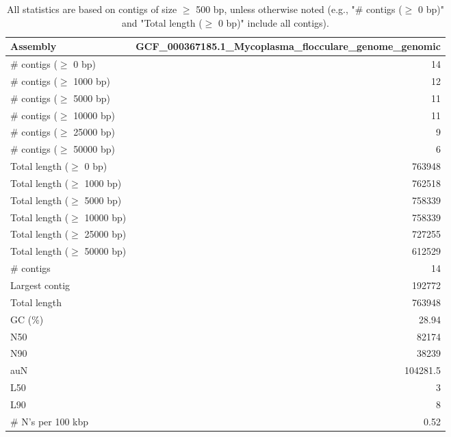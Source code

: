 \documentclass[12pt,a4paper]{article}
\begin{document}
\begin{table}[ht]
\begin{center}
\caption{All statistics are based on contigs of size $\geq$ 500 bp, unless otherwise noted (e.g., "\# contigs ($\geq$ 0 bp)" and "Total length ($\geq$ 0 bp)" include all contigs).}
\begin{tabular}{|l*{1}{|r}|}
\hline
Assembly & GCF\_000367185.1\_Mycoplasma\_flocculare\_genome\_genomic \\ \hline
\# contigs ($\geq$ 0 bp) & 14 \\ \hline
\# contigs ($\geq$ 1000 bp) & 12 \\ \hline
\# contigs ($\geq$ 5000 bp) & 11 \\ \hline
\# contigs ($\geq$ 10000 bp) & 11 \\ \hline
\# contigs ($\geq$ 25000 bp) & 9 \\ \hline
\# contigs ($\geq$ 50000 bp) & 6 \\ \hline
Total length ($\geq$ 0 bp) & 763948 \\ \hline
Total length ($\geq$ 1000 bp) & 762518 \\ \hline
Total length ($\geq$ 5000 bp) & 758339 \\ \hline
Total length ($\geq$ 10000 bp) & 758339 \\ \hline
Total length ($\geq$ 25000 bp) & 727255 \\ \hline
Total length ($\geq$ 50000 bp) & 612529 \\ \hline
\# contigs & 14 \\ \hline
Largest contig & 192772 \\ \hline
Total length & 763948 \\ \hline
GC (\%) & 28.94 \\ \hline
N50 & 82174 \\ \hline
N90 & 38239 \\ \hline
auN & 104281.5 \\ \hline
L50 & 3 \\ \hline
L90 & 8 \\ \hline
\# N's per 100 kbp & 0.52 \\ \hline
\end{tabular}
\end{center}
\end{table}
\end{document}
